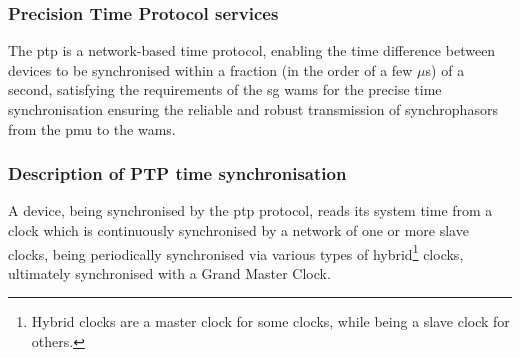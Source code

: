  






\subsubsection{Precision Time Protocol services}
The \acrfull{ptp} is a network-based time protocol, enabling the time difference between devices to be synchronised within a fraction (in the order of a few $\mu$s) of a second, satisfying the requirements of the \acrshort{sg} \acrshort{wams} for the precise time synchronisation  ensuring the reliable and robust transmission of synchrophasors from the \acrshort{pmu} to the \acrshort{wams}. 
\subsubsection{Description of PTP time synchronisation}

A device, being synchronised  by the \acrshort{ptp} protocol, reads its system time from a clock which is continuously synchronised by a network of one or more slave clocks, being periodically synchronised via various types of hybrid\footnote{Hybrid clocks are a master clock for some clocks, while being a slave clock for others.} clocks, ultimately synchronised with a Grand Master Clock.\\ 


